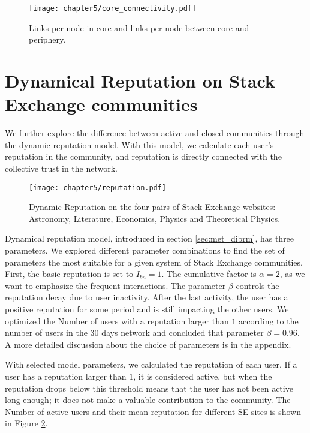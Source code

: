\begin{figure}[h]
	\centering
	\texttt{[image: chapter5/core\_connectivity.pdf]}
	\caption{Links per node in core and links per node between core and periphery.}
	\label{fig:links_per_node}
\end{figure}

\section{Dynamical Reputation on Stack Exchange communities}

We further explore the difference between active and closed communities through the dynamic reputation model. With this model, we calculate each user's reputation in the community, and reputation is directly connected with the collective trust in the network. 

\begin{figure}[h]
	\centering
	\texttt{[image: chapter5/reputation.pdf]}
	\caption[Dynamic Reputation of Stack Exchange websites.]{Dynamic Reputation on the four pairs of Stack Exchange websites: Astronomy, Literature, Economics,  Physics and Theoretical Physics.}
	\label{fig:dr6panel}
\end{figure}

Dynamical reputation model, introduced in section \ref{sec:met_dibrm}, has three parameters. We explored different parameter combinations to find the set of parameters the most suitable for a given system of Stack Exchange communities. First, the basic reputation is set to $I_{bn}=1$. The cumulative factor is $\alpha=2$, as we want to emphasize the frequent interactions. The parameter $\beta$ controls the reputation decay due to user inactivity. After the last activity, the user has a positive reputation for some period and is still impacting the other users. We optimized the Number of users with a reputation larger than $1$ according to the number of users in the 30 days network and concluded that parameter $\beta=0.96$. A more detailed discussion about the choice of parameters is in the appendix. 

With selected model parameters, we calculated the reputation of each user. If a user has a reputation larger than $1$, it is considered active, but when the reputation drops below this threshold means that the user has not been active long enough; it does not make a valuable contribution to the community. The Number of active users and their mean reputation for different SE sites is shown in Figure \ref{fig:dr6panel}. 

